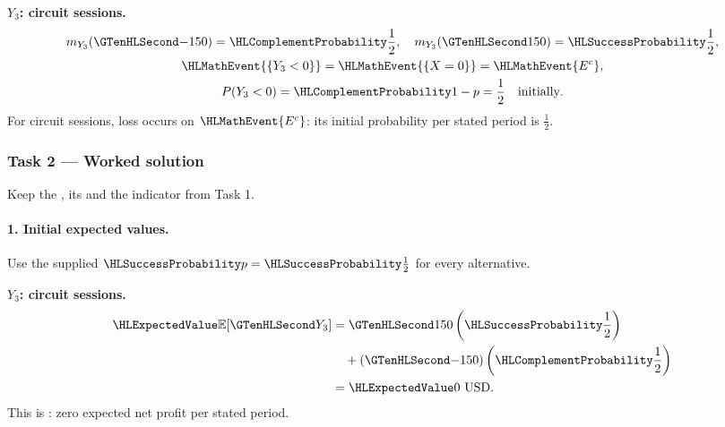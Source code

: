 \noindent\begin{minipage}[t]{.48\linewidth}
\textbf{$Y_3$: circuit sessions.}
\[
\begin{gathered}
m_{Y_3}(\Money{-150})=\FailureProb{\frac{1}{2}},\quad m_{Y_3}(\Money{150})=\SuccessProb{\frac{1}{2}},\\
\HLMathEvent{\{Y_3<0\}}=\HLMathEvent{\{X=0\}}=\HLMathEvent{E^c},\\
P(Y_3<0)=\FailureProb{1-p}= \frac{1}{2}\quad\text{initially}.
\end{gathered}
\]
For circuit sessions, loss occurs on $\HLMathEvent{E^c}$: its initial probability per stated period is $\frac{1}{2}$.
\end{minipage}\par
{}
\clearpage\subsubsection*{Task 2 --- Worked solution}\label{sol:c3-agriculture-decision}
Keep the , its  and the indicator from Task 1.
\paragraph{1. Initial expected values.}
Use the supplied $\SuccessProb{p}=\SuccessProb{\frac{1}{2}}$ for every alternative.
\noindent\begin{minipage}[t]{.48\linewidth}
\textbf{$Y_3$: circuit sessions.}
\[
\begin{aligned}
\ExpectedValue{\mathbb E}[\Money{Y_3}]&=\Money{150}\left(\SuccessProb{\frac{1}{2}}\right)\\
&\quad +(\Money{-150})\left(\FailureProb{\frac{1}{2}}\right)\\
&=\ExpectedValue{0\ \text{USD}}.
\end{aligned}
\]
This is : zero expected net profit per stated period.
\end{minipage}\par
